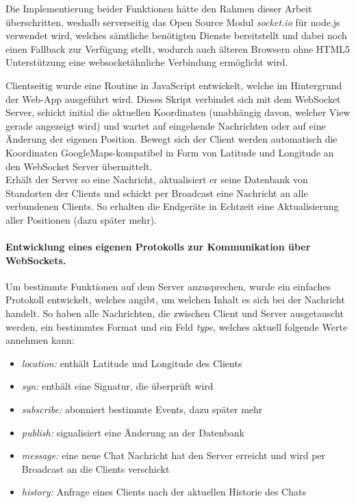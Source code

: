 Die Implementierung beider Funktionen hätte den Rahmen dieser Arbeit überschritten, weshalb serverseitig das Open Source Modul \emph{socket.io} \cite{socket.io} für node.js verwendet wird, welches sämtliche benötigten Dienste bereitstellt und dabei noch einen Fallback zur Verfügung stellt, wodurch auch älteren Browsern ohne HTML5 Unterstützung eine websocketähnliche Verbindung ermöglicht wird.\par

Clientseitig wurde eine Routine in JavaScript entwickelt, welche im Hintergrund der Web-App ausgeführt wird. Dieses Skript verbindet sich mit dem WebSocket Server, schickt initial die aktuellen Koordinaten (unabhängig davon, welcher View gerade angezeigt wird) und wartet auf eingehende Nachrichten oder auf eine Änderung der eigenen Position. Bewegt sich der Client werden automatisch die Koordinaten GoogleMaps-kompatibel in Form von Latitude und Longitude an den WebSocket Server übermittelt.\\
Erhält der Server so eine Nachricht, aktualisiert er seine Datenbank von Standorten der Clients und schickt per Broadcast eine Nachricht an alle verbundenen Clients. So erhalten die Endgeräte in Echtzeit eine Aktualisierung aller Positionen (dazu später mehr).

\paragraph{Entwicklung eines eigenen Protokolls zur Kommunikation über WebSockets.}
Um bestimmte Funktionen auf dem Server anzusprechen, wurde ein einfaches Protokoll entwickelt, welches angibt, um welchen Inhalt es sich bei der Nachricht handelt. So haben alle Nachrichten, die zwischen Client und Server ausgetauscht werden, ein bestimmtes Format und ein Feld \emph{type}, welches aktuell folgende Werte annehmen kann:

\begin{itemize}
	\item[] \emph{location:} enthält Latitude und Longitude des Clients
	\item[] \emph{syn:} enthält eine Signatur, die überprüft wird
	\item[] \emph{subscribe:} abonniert bestimmte Events, dazu später mehr
	\item[] \emph{publish:} signalisiert eine Änderung an der Datenbank
	\item[] \emph{message:} eine neue Chat Nachricht hat den Server erreicht und wird per Broadcast an die Clients verschickt
	\item[] \emph{history:} Anfrage eines Clients nach der aktuellen Historie des Chats
\end{itemize}

